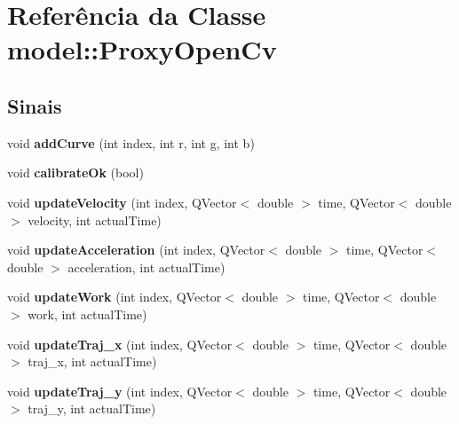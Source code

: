 \hypertarget{classmodel_1_1ProxyOpenCv}{
\section{Referência da Classe model::ProxyOpenCv}
\label{classmodel_1_1ProxyOpenCv}
}
\subsection*{Sinais}
\begin{DoxyCompactItemize}
\item 
\hypertarget{classmodel_1_1ProxyOpenCv_abc2c90759028f473f79fa994beba5b02}{
void {\bfseries addCurve} (int index, int r, int g, int b)}
\label{classmodel_1_1ProxyOpenCv_abc2c90759028f473f79fa994beba5b02}

\item 
\hypertarget{classmodel_1_1ProxyOpenCv_aa84356784529c08222156ac62f94437b}{
void {\bfseries calibrateOk} (bool)}
\label{classmodel_1_1ProxyOpenCv_aa84356784529c08222156ac62f94437b}

\item 
\hypertarget{classmodel_1_1ProxyOpenCv_aa6bfcf656fee6a599f37526cd6e334ea}{
void {\bfseries updateVelocity} (int index, QVector$<$ double $>$ time, QVector$<$ double $>$ velocity, int actualTime)}
\label{classmodel_1_1ProxyOpenCv_aa6bfcf656fee6a599f37526cd6e334ea}

\item 
\hypertarget{classmodel_1_1ProxyOpenCv_a23504b59729cb379963686ce027cc6e0}{
void {\bfseries updateAcceleration} (int index, QVector$<$ double $>$ time, QVector$<$ double $>$ acceleration, int actualTime)}
\label{classmodel_1_1ProxyOpenCv_a23504b59729cb379963686ce027cc6e0}

\item 
\hypertarget{classmodel_1_1ProxyOpenCv_a438813b183727fce951ac701017e4738}{
void {\bfseries updateWork} (int index, QVector$<$ double $>$ time, QVector$<$ double $>$ work, int actualTime)}
\label{classmodel_1_1ProxyOpenCv_a438813b183727fce951ac701017e4738}

\item 
\hypertarget{classmodel_1_1ProxyOpenCv_a12d2012abec5b70b94103cc22fdbf30a}{
void {\bfseries updateTraj\_\-x} (int index, QVector$<$ double $>$ time, QVector$<$ double $>$ traj\_\-x, int actualTime)}
\label{classmodel_1_1ProxyOpenCv_a12d2012abec5b70b94103cc22fdbf30a}

\item 
\hypertarget{classmodel_1_1ProxyOpenCv_a00203a1b65ecb1cecb41c07eb69225b8}{
void {\bfseries updateTraj\_\-y} (int index, QVector$<$ double $>$ time, QVector$<$ double $>$ traj\_\-y, int actualTime)}
\label{classmodel_1_1ProxyOpenCv_a00203a1b65ecb1cecb41c07eb69225b8}


\end{DoxyCompactItemize}
